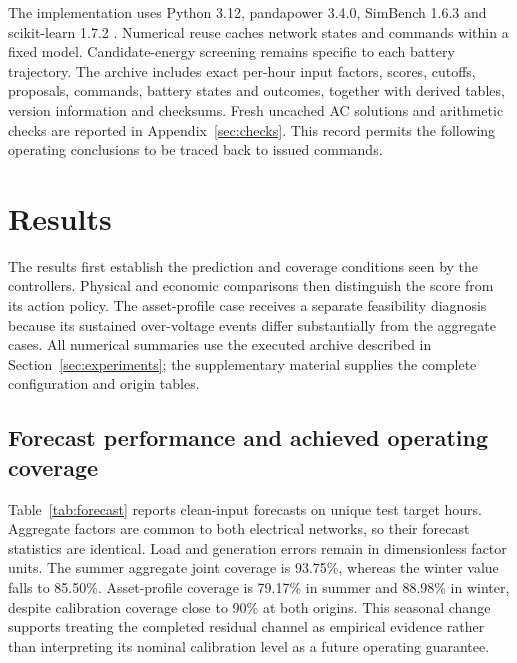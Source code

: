 \documentclass[preprint,12pt]{elsarticle}
\begin{document}
The implementation uses Python 3.12, pandapower 3.4.0, SimBench 1.6.3 and scikit-learn 1.7.2 \cite{thurner,software}. Numerical reuse caches network states and commands within a fixed model. Candidate-energy screening remains specific to each battery trajectory. The archive includes exact per-hour input factors, scores, cutoffs, proposals, commands, battery states and outcomes, together with derived tables, version information and checksums. Fresh uncached AC solutions and arithmetic checks are reported in Appendix~\ref{sec:checks}. This record permits the following operating conclusions to be traced back to issued commands.

\section{Results}\label{sec:results}
The results first establish the prediction and coverage conditions seen by the controllers. Physical and economic comparisons then distinguish the score from its action policy. The asset-profile case receives a separate feasibility diagnosis because its sustained over-voltage events differ substantially from the aggregate cases. All numerical summaries use the executed archive described in Section~\ref{sec:experiments}; the supplementary material supplies the complete configuration and origin tables.

\subsection{Forecast performance and achieved operating coverage}
Table~\ref{tab:forecast} reports clean-input forecasts on unique test target hours. Aggregate factors are common to both electrical networks, so their forecast statistics are identical. Load and generation errors remain in dimensionless factor units. The summer aggregate joint coverage is 93.75\%, whereas the winter value falls to 85.50\%. Asset-profile coverage is 79.17\% in summer and 88.98\% in winter, despite calibration coverage close to 90\% at both origins. This seasonal change supports treating the completed residual channel as empirical evidence rather than interpreting its nominal calibration level as a future operating guarantee.
\end{document}
